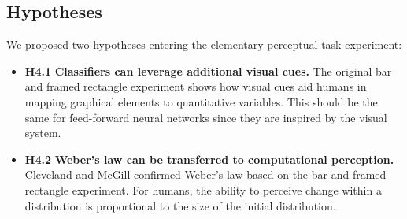 \subsection{Hypotheses}

We proposed two hypotheses entering the elementary perceptual task experiment:

\begin{itemize}
	\item \textbf{H4.1} \textbf{Classifiers can leverage additional visual cues.} The original bar and framed rectangle experiment shows how visual cues aid humans in mapping graphical elements to quantitative variables. This should be the same for feed-forward neural networks since they are inspired by the visual system.
	\item \textbf{H4.2} \textbf{Weber's law can be transferred to computational perception.} Cleveland and McGill confirmed Weber's law based on the bar and framed rectangle experiment. For humans, the ability to perceive change within a distribution is proportional to the size of the initial distribution.
\end{itemize}

